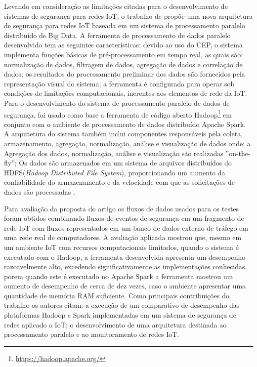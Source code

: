 \documentclass[ti,table]{texufpel} %
\begin{document}
     

    Levando em consideração as limitações citadas para o desenvolvimento de sistemas de segurança para redes IoT, o trabalho de \cite{art8kotenko2017parallel} propõe uma nova arquitetura de segurança para redes IoT baseada em um sistema de processamento paralelo distribuído de Big Data. A ferramenta de processamento de dados paralelo desenvolvido tem as seguintes características: devido ao uso do CEP, o sistema implementa funções básicas de pré-processamento em tempo real, as quais são: normalização de dados, filtragem de dados, agregação de dados e correlação de dados; os resultados do processamento preliminar dos dados são fornecidos pela representação visual do sistema; a ferramenta é configurada para operar sob condições de limitações computacionais, inerentes aos elementos de rede da IoT. Para o desenvolvimento do sistema de processamento paralelo de dados de segurança, foi usado como base a ferramenta de código aberto Hadoop\footnote{\url{https://hadoop.apache.org/}} em conjunto com o ambiente de processamento de dados distribuído Apache Spark. A arquitetura do sistema também inclui componentes responsáveis pela coleta, armazenamento, agregação, normalização, análise e visualização de dados onde: a Agregação dos dados, normalização, análise e visualização são realizadas ''on-the-fly''; Os dados são armazenados em um sistema de arquivos distribuídos do HDFS(\textit{Hadoop Distributed File System}), proporcionando um aumento da confiabilidade do armazenamento e da velocidade com que as solicitações de dados são processadas \cite{art8kotenko2017parallel}. 

     

  

    Para avaliação da proposta do artigo os fluxos de dados usados para os testes foram obtidos combinando fluxos de eventos de segurança em um fragmento de rede IoT com fluxos representados em um banco de dados externo de tráfego em uma rede real de computadores. A avaliação aplicada mostrou que, mesmo em um ambiente IoT com recursos computacionais limitados, quando o sistema é executado com o Hadoop, a ferramenta desenvolvida apresenta um desempenho razoavelmente alto, excedendo significativamente as implementações conhecidas, porem quando este é executado no Apache Spark a ferramenta mostrou um aumento de desempenho de cerca de dez vezes, caso o ambiente apresentar uma quantidade de memória RAM suficiente. Como principais contribuições do trabalho os autores citam: a execução de um comparativo de desempenho das plataformas Hadoop e Spark implementadas em um sistema de segurança de redes aplicado a IoT; o desenvolvimento de uma arquitetura destinada ao processamento paralelo e ao monitoramento de redes IoT.  
\end{document}
